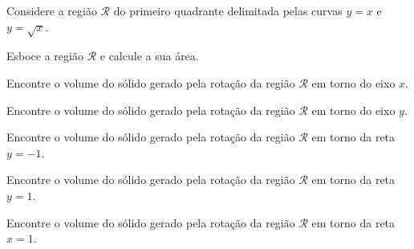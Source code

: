 \begin{exercises}
\begin{exercise}
Considere a região $\mathcal{R}$ do primeiro quadrante delimitada pelas curvas $y=x$ e $y=\sqrt{x}$.
\begin{alphalist}
  \item Esboce a região $\mathcal{R}$ e calcule a sua área.
  \item Encontre o volume do sólido gerado pela rotação da região $\mathcal{R}$ em torno do eixo $x$.
  \item Encontre o volume do sólido gerado pela rotação da região $\mathcal{R}$ em torno do eixo $y$.
  \item Encontre o volume do sólido gerado pela rotação da região $\mathcal{R}$ em torno da reta $y=-1$.
  \item Encontre o volume do sólido gerado pela rotação da região $\mathcal{R}$ em torno da reta $y=1$.
  \item Encontre o volume do sólido gerado pela rotação da região $\mathcal{R}$ em torno da reta $x=1$.
\end{alphalist}
\begin{answer}
\begin{mathlist}[3]
  \item {}
  \item {}
  \item {}
  \item {}
  \item {}
  \item {}
\end{mathlist}
\end{answer}
\end{exercise}


\end{exercises}
